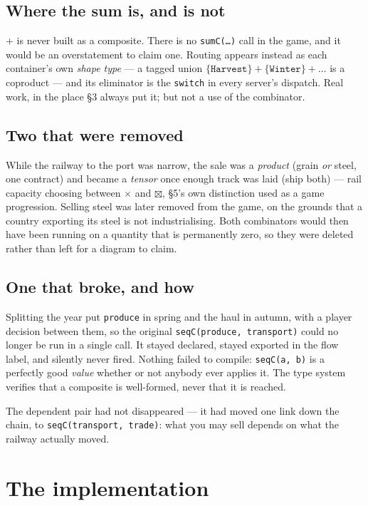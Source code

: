 \documentclass[11pt,a4paper]{article}
\begin{document}
\subsection{Where the sum is, and is not}

$+$ is never built as a composite. There is no \texttt{sumC(\dots)} call in the
game, and it would be an overstatement to claim one. Routing appears instead as
each container's own \emph{shape type} --- a tagged union
$\{\texttt{Harvest}\} + \{\texttt{Winter}\} + \dots$ is a coproduct --- and its
eliminator is the \texttt{switch} in every server's dispatch. Real work, in the
place \S3 always put it; but not a use of the combinator.

\subsection{Two that were removed}

While the railway to the port was narrow, the sale was a \emph{product} (grain
\emph{or} steel, one contract) and became a \emph{tensor} once enough track was
laid (ship both) --- rail capacity choosing between $\times$ and $\boxtimes$,
\S5's own distinction used as a game progression. Selling steel was later
removed from the game, on the grounds that a country exporting its steel is not
industrialising. Both combinators would then have been running on a quantity
that is permanently zero, so they were deleted rather than left for a diagram
to claim.

\subsection{One that broke, and how}

Splitting the year put \texttt{produce} in spring and the haul in autumn, with
a player decision between them, so the original \texttt{seqC(produce,
transport)} could no longer be run in a single call. It stayed declared,
stayed exported in the flow label, and silently never fired. Nothing failed to
compile: \texttt{seqC(a, b)} is a perfectly good \emph{value} whether or not
anybody ever applies it. The type system verifies that a composite is
well-formed, never that it is reached.

The dependent pair had not disappeared --- it had moved one link down the
chain, to \texttt{seqC(transport, trade)}: what you may sell depends on what the
railway actually moved.

\section{The implementation}
\end{document}
